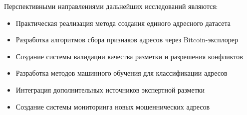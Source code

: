 Перспективными направлениями дальнейших исследований являются:

\begin{itemize}
    \item Практическая реализация метода создания единого адресного датасета
    \item Разработка алгоритмов сбора признаков адресов через Bitcoin-эксплорер
    \item Создание системы валидации качества разметки и разрешения конфликтов
    \item Разработка методов машинного обучения для классификации адресов
    \item Интеграция дополнительных источников экспертной разметки
    \item Создание системы мониторинга новых мошеннических адресов
\end{itemize}
